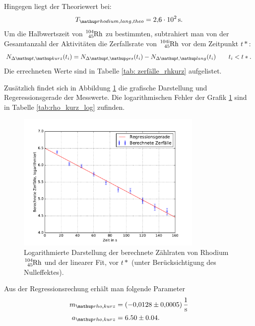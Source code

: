 Hingegen liegt der Theoriewert\cite{rhodium_lang_halb} bei:
\begin{equation}
  \label{eq:halbwertzeit_rhodium_theo}
  T\ua{rhodium, lang, theo}=\SI{2.6 e+2}{\second}.
\end{equation}
Um die Halbwertszeit von $\ce{^{104}_{45} Rh}$ zu bestimmten, subtrahiert man von der
Gesamtanzahl der Aktivitäten die Zerfallsrate von $\ce{^{104i}_{45} Rh}$ vor dem
Zeitpunkt $t*$:
\begin{equation*}
  N_{\Delta \map{t}, \map{kurz}}(t_i)=N_{\Delta \map{t}, \map{ges}}(t_i)-N_{\Delta \map{t}, \map{lang}}(t_i) \qquad t_i<t*.
\end{equation*}
Die errechneten Werte sind in Tabelle \ref{tab: zerfälle_rhkurz} aufgelistet.


Zusätzlich findet sich in Abbildung \ref{fig: plot_rhodium_kurz} die grafische Darstellung
und Regeressionsgerade der Messwerte. Die logarithmischen Fehler der Grafik \ref{fig: plot_rhodium_kurz}
sind in Tabelle \ref{tab:rho_kurz_log} zufinden.
\begin{figure}
  \centering
  \includegraphics[width=0.8\textwidth]{pics/rhodium_kurz_berechnet.pdf}
  \caption{Logarithmierte Darstellung der berechnete Zählraten von Rhodium $\ce{^{104}_{45} Rh}$ und der linearer Fit, vor $t*$ (unter Berücksichtigung des Nulleffektes).}
  \label{fig: plot_rhodium_kurz}
\end{figure}
Aus der Regressionsrechung erhält man folgende Parameter
\begin{align}
  \label{eq:parameter_rhodium_kurz}
  \begin{aligned}
    m\ua{rho,kurz}&=\SI{-0.0128\pm0.0005}{\per\second}\\
    a\ua{rho,kurz}&=6.50\pm0.04.
  \end{aligned}
\end{align}
